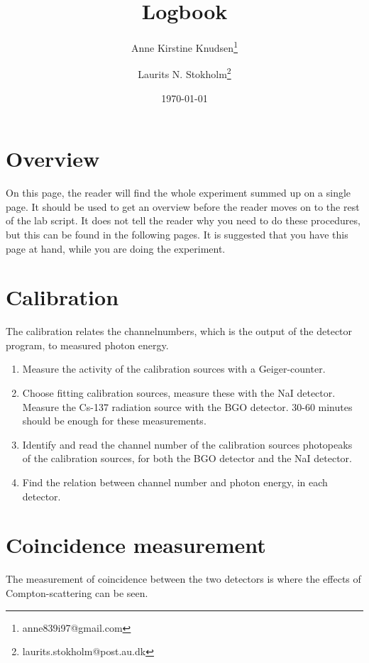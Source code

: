 \documentclass[a4paper, oneside, onecolumn, 11pt]{memoir}
\title{Logbook}
\author[1]{Anne Kirstine Knudsen\thanks{anne839i97@gmail.com}}
\author[1]{Laurits N. Stokholm\thanks{laurits.stokholm@post.au.dk}}
\affil[1]{Department of Physics and Astronomy, Aarhus University}
\date{\today}
\begin{document}
\maketitle
\section{Overview}
On this page, the reader will find the whole experiment summed up on a single
page. It should be used to get an overview before the reader moves on to the
rest of the lab script. It does not tell the reader why you need to do these
procedures, but this can be found in the following pages. It is suggested that
you have this page at hand, while you are doing the experiment.

\section{Calibration}
The calibration relates the channelnumbers, which is the output of the detector program, to measured photon energy.
\begin{enumerate}
\item Measure the activity of the calibration sources with a Geiger-counter.
\item Choose fitting calibration sources, measure these with the NaI detector.
    Measure the Cs-137 radiation source with the BGO detector. 30-60 minutes
    should be enough for these measurements.
\item Identify and read the channel number of the calibration sources
    photopeaks of the calibration sources, for both the BGO detector and the
    NaI detector.
\item Find the relation between channel number and photon energy, in each
    detector.
\end{enumerate}

\section{Coincidence measurement}
The measurement of coincidence between the two detectors is where the effects of Compton-scattering can be seen.
\end{document}
